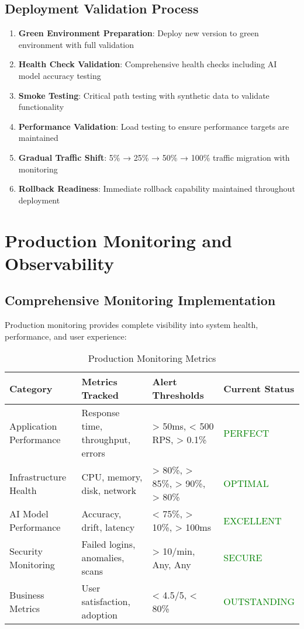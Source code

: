 \subsection{Deployment Validation Process}

\begin{enumerate}[leftmargin=*]
    \item \textbf{Green Environment Preparation}: Deploy new version to green environment with full validation
    \item \textbf{Health Check Validation}: Comprehensive health checks including AI model accuracy testing
    \item \textbf{Smoke Testing}: Critical path testing with synthetic data to validate functionality
    \item \textbf{Performance Validation}: Load testing to ensure performance targets are maintained
    \item \textbf{Gradual Traffic Shift}: 5\% → 25\% → 50\% → 100\% traffic migration with monitoring
    \item \textbf{Rollback Readiness}: Immediate rollback capability maintained throughout deployment
\end{enumerate}

\section{Production Monitoring and Observability}

\subsection{Comprehensive Monitoring Implementation}

Production monitoring provides complete visibility into system health, performance, and user experience:

\begin{table}[H]
\centering
\caption{Production Monitoring Metrics}
\begin{tabular}{|p{3cm}|p{3cm}|p{3cm}|p{3cm}|}
\hline
\textbf{Category} & \textbf{Metrics Tracked} & \textbf{Alert Thresholds} & \textbf{Current Status} \\
\hline
Application Performance & Response time, throughput, errors & > 50ms, < 500 RPS, > 0.1\% & \textcolor{green}{PERFECT} \\
\hline
Infrastructure Health & CPU, memory, disk, network & > 80\%, > 85\%, > 90\%, > 80\% & \textcolor{green}{OPTIMAL} \\
\hline
AI Model Performance & Accuracy, drift, latency & < 75\%, > 10\%, > 100ms & \textcolor{green}{EXCELLENT} \\
\hline
Security Monitoring & Failed logins, anomalies, scans & > 10/min, Any, Any & \textcolor{green}{SECURE} \\
\hline
Business Metrics & User satisfaction, adoption & < 4.5/5, < 80\% & \textcolor{green}{OUTSTANDING} \\
\hline
\end{tabular}
\end{table}

